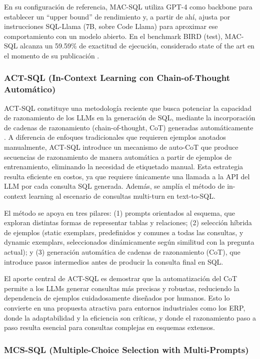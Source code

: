 \documentclass[journal]{IEEEtran}
\begin{document}
En su configuración de referencia, MAC-SQL utiliza GPT-4 como backbone para establecer un ``upper bound'' de rendimiento y, a partir de ahí, ajusta por instrucciones SQL-Llama (7B, sobre Code Llama) para aproximar ese comportamiento con un modelo abierto. En el benchmark BIRD (test), MAC-SQL alcanza un 59.59\% de exactitud de ejecución, considerado state of the art en el momento de su publicación \cite{wang2025mac}.

\subsubsection{ACT-SQL (In-Context Learning con Chain-of-Thought Automático)}

ACT-SQL constituye una metodología reciente que busca potenciar la capacidad de razonamiento de los LLMs en la generación de SQL, mediante la incorporación de cadenas de razonamiento (chain-of-thought, CoT) generadas automáticamente \cite{zhang2023act}. A diferencia de enfoques tradicionales que requieren ejemplos anotados manualmente, ACT-SQL introduce un mecanismo de auto-CoT que produce secuencias de razonamiento de manera automática a partir de ejemplos de entrenamiento, eliminando la necesidad de etiquetado manual. Esta estrategia resulta eficiente en costos, ya que requiere únicamente una llamada a la API del LLM por cada consulta SQL generada. Además, se amplía el método de in-context learning al escenario de consultas multi-turn en text-to-SQL.

El método se apoya en tres pilares: (1) prompts orientados al esquema, que exploran distintas formas de representar tablas y relaciones; (2) selección híbrida de ejemplos (static exemplars, predefinidos y comunes a todas las consultas, y dynamic exemplars, seleccionados dinámicamente según similitud con la pregunta actual); y (3) generación automática de cadenas de razonamiento (CoT), que introduce pasos intermedios antes de producir la consulta final en SQL.

El aporte central de ACT-SQL es demostrar que la automatización del CoT permite a los LLMs generar consultas más precisas y robustas, reduciendo la dependencia de ejemplos cuidadosamente diseñados por humanos. Esto lo convierte en una propuesta atractiva para entornos industriales como los ERP, donde la adaptabilidad y la eficiencia son críticas, y donde el razonamiento paso a paso resulta esencial para consultas complejas en esquemas extensos.

\subsubsection{MCS-SQL (Multiple-Choice Selection with Multi-Prompts)}
\end{document}
